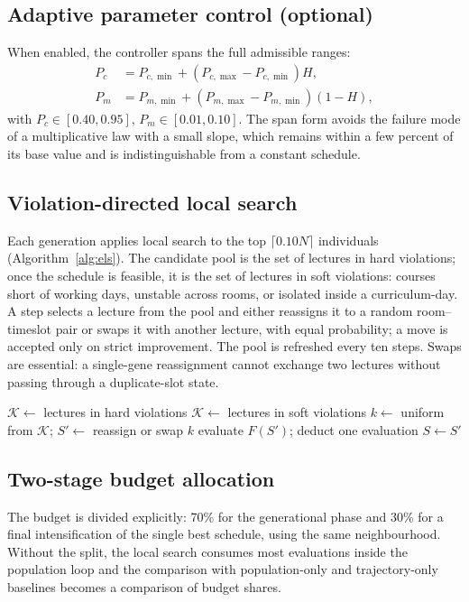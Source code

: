\documentclass[journal]{IEEEtran}
\begin{document}
\subsection{Adaptive parameter control (optional)}
When enabled, the controller spans the full admissible ranges:
\begin{align}
P_c &= P_{c,\min}+(P_{c,\max}-P_{c,\min})H,\\
P_m &= P_{m,\min}+(P_{m,\max}-P_{m,\min})(1-H),
\end{align}
with $P_c\in[0.40,0.95]$, $P_m\in[0.01,0.10]$. The span form avoids the failure mode of a multiplicative law with a small slope, which remains within a few percent of its base value and is indistinguishable from a constant schedule.

\subsection{Violation-directed local search}
Each generation applies local search to the top $\lceil0.10N\rceil$ individuals (Algorithm~\ref{alg:els}). The candidate pool is the set of lectures in hard violations; once the schedule is feasible, it is the set of lectures in soft violations: courses short of working days, unstable across rooms, or isolated inside a curriculum-day. A step selects a lecture from the pool and either reassigns it to a random room--timeslot pair or swaps it with another lecture, with equal probability; a move is accepted only on strict improvement. The pool is refreshed every ten steps. Swaps are essential: a single-gene reassignment cannot exchange two lectures without passing through a duplicate-slot state.

\begin{algorithm}[!t]
\caption{Violation-Directed Local Search}
\label{alg:els}
\begin{algorithmic}[1]
            \State $\mathcal{K}\gets$ lectures in hard violations
             $\mathcal{K}\gets$ lectures in soft violations \EndIf
        \EndIf
        \State $k\gets$ uniform from $\mathcal{K}$; $S'\gets$ reassign or swap $k$
        \State evaluate $F(S')$; deduct one evaluation
         $S\gets S'$ \EndIf
    \EndFor
\EndFor
\end{algorithmic}
\end{algorithm}

\subsection{Two-stage budget allocation}
The budget is divided explicitly: 70\% for the generational phase and 30\% for a final intensification of the single best schedule, using the same neighbourhood. Without the split, the local search consumes most evaluations inside the population loop and the comparison with population-only and trajectory-only baselines becomes a comparison of budget shares.
\end{document}
